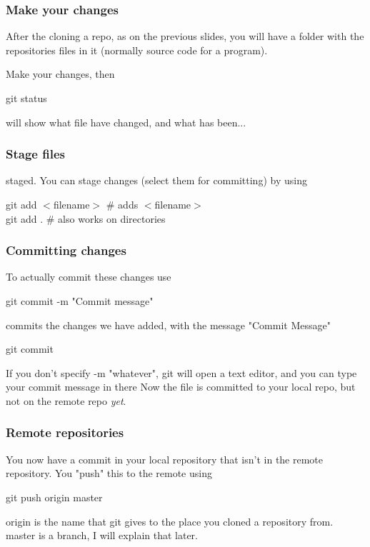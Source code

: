 \documentclass[xcolor=dvipsnames]{beamer}
\begin{document}
\begin{frame}
    \frametitle{Make your changes}
    After the cloning a repo, as on the previous slides, you will have a folder with the repositories
    files in it (normally source code for a program).

    Make your changes, then
    \begin{block}{}
        git status
    \end{block}
    will show what file have changed, and what has been...
\end{frame}

\begin{frame}
    \frametitle{Stage files}
    staged.
    You can stage changes (select them for committing) by using
    \begin{block}{}
        git add $<$filename$>$ \# adds $<$filename$>$\\
        git add . \# also works on directories
    \end{block}
\end{frame}

\begin{frame}
    \frametitle{Committing changes}
    To actually commit these changes use
    \begin{block}{}
        git commit -m "Commit message"
    \end{block}
    commits the changes we have added, with the message "Commit Message"\\
    
    \begin{block}{}    
        git commit
    \end{block}
     If you don't specify -m "whatever", git will open a text editor, and you can type your commit message in there 
    Now the file is committed to your local repo, but not on the remote repo \emph{yet}.
\end{frame}

\begin{frame}
    \frametitle{Remote repositories}

    You now have a commit in your local repository that isn't in the remote repository.
    You "push" this to the remote using
    \begin{block}{}
        git push origin master
    \end{block}
    
    origin is the name that git gives to the place you cloned a repository from.\\
    master is a branch, I will explain that later.

\end{frame}
\end{document}
